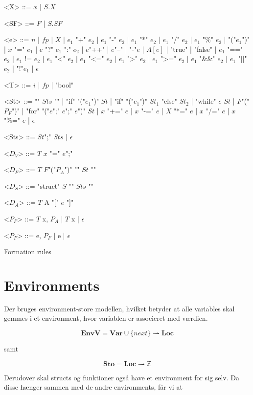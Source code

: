 \begin{Grammar}
 \begin{grammar}

 <X> ::= $x$ | $S.X$
 
 <SF> ::= $F$ | $S.SF$

 <e> ::= $n$ | $fp$ | $X$  | $e_1$ "+" $e_2$ | $e_1$ "-" $e_2$ | $e_1$ "*" $e_2$ | $e_1$ "/" $e_2$ | $e_1$ "\%" $e_2$ | "("$e_1$")" | $x$ "=" $e_1$ | $e$ "?" $e_1$ ":" $e_2$ | $e$"++" | $e$"--" | "-"$e$ | $A[e]$ | "true" | "false" | $e_1$ "==" $e_2$ | $e_1$ != $e_2$ | $e_1$ "<" $e_2$ | $e_1$ "<=" $e_2$ | $e_1$ ">" $e_2$ | $e_1$ ">=" $e_2$ | $e_1$ "\&\&" $e_2$ | $e_1$ "||" $e_2$ | "!"$e_1$ | $\epsilon$

 <T> ::= $i$ | $fp$ | "bool"
 
 <St> ::= "{" $Sts$ "}" | "if" "("$e_1$")" $St$ | "if" "("$e_1$")" $St_1$ "else" $St_2$ | "while" $e$ $St$ | $F$"("$P_F$")" | "for" "("$e$";" $e$";" $e$")" $St$ | $x$ "+=" $e$ | $x$ "-=" $e$ | $X$ "*=" $e$ | $x$ "/=" $e$ | $x$ "\%=" $e$ | $\epsilon$
 
 <Sts> ::= $St$";" $Sts$ | $\epsilon$
 
 <$D_V$> ::= $T$ $x$ "=" $e$";"
 
 <$D_F$> ::= $T$ $F$"("$P_A$")" "{" $St$ "}"
 
 <$D_S$> ::= "struct" $S$ "{" $Sts$ "}"
 
 <$D_A$> ::= $T$ A "[" $e$ "]"
 
 <$P_F$> ::= $T$ x, $P_A$ | $T$ x | $\epsilon$
 
 <$P_F$> ::= e, $P_F$ | e | $\epsilon$

 \end{grammar}
 \caption{Formation rules}\label{gra:formationrules}
\end{Grammar}

\tocless \section{Environments}

\noindent Der bruges environment-store modellen, hvilket betyder at alle variables skal gemmes i et environment, hvor variablen er associeret med værdien.

$$ \textbf{EnvV} = \textbf{Var} \cup \{next\} \rightharpoonup \textbf{Loc} $$

\noindent samt

$$ \textbf{Sto} = \textbf{Loc} \rightharpoonup \mathds{Z} $$

\noindent Derudover skal structs og funktioner også have et environment for sig selv. Da disse hænger sammen med de andre environments, får vi at

